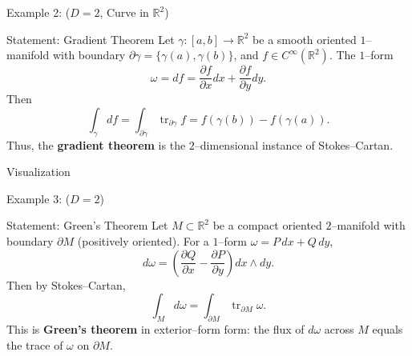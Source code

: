 \begin{frame}{Example 2: (\(D=2\), Curve in $\mathbb{R}^2$)}
\begin{block}{Statement: Gradient Theorem }
Let $\gamma:[a,b]\to\mathbb{R}^2$ be a smooth oriented $1$–manifold with boundary $\partial\gamma=\{\gamma(a),\gamma(b)\}$,
and \(f\in C^\infty(\mathbb{R}^2)\).
The $1$–form
\[
\omega = df = \frac{\partial f}{\partial x}dx + \frac{\partial f}{\partial y}dy.
\]
Then
\[
\int_{\gamma}d f
=\int_{\partial\gamma}\operatorname{tr}_{\partial\gamma}f
=f(\gamma(b))-f(\gamma(a)).
\]
Thus, the \textbf{gradient theorem} is the $2$–dimensional instance of Stokes–Cartan.
\end{block}
\end{frame}

\begin{frame}{Visualization}
\begin{center}
\end{center}
\end{frame}

\begin{frame}{Example 3: (\(D=2\))}
\vspace{-0.3cm}
\begin{block}{Statement: Green’s Theorem }
Let $M\subset\mathbb{R}^2$ be a compact oriented $2$–manifold with boundary $\partial M$ (positively oriented).
For a $1$–form $\omega = P\,dx + Q\,dy$,
\vspace{-0.2cm}
\[
d\omega
=\left(\frac{\partial Q}{\partial x}-\frac{\partial P}{\partial y}\right)dx\wedge dy.
\]
\vspace{-0.2cm}
Then by Stokes–Cartan,
\vspace{-0.2cm}
\[
\int_M d\omega
=\int_{\partial M}\operatorname{tr}_{\partial M}\omega.
\]
This is \textbf{Green’s theorem} in exterior–form form:
the flux of $d\omega$ across $M$ equals the trace of $\omega$ on $\partial M$.
\end{block}

\begin{center}
\vspace{-0.2cm}
\end{center}
\end{frame}


